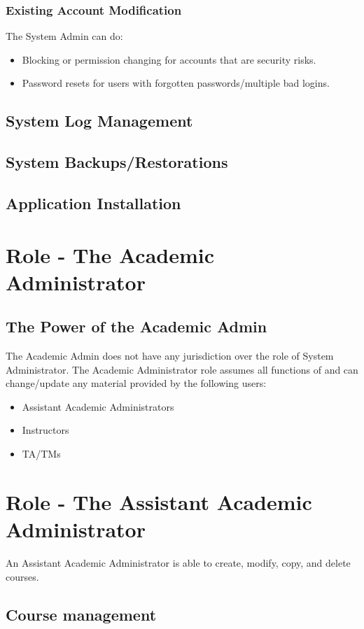 \documentclass{article}
\begin{document}
\subsubsection{Existing Account Modification}
The System Admin can do:
\begin{itemize}
  \item Blocking or permission changing for accounts that are security risks.
  \item Password resets for users with forgotten passwords/multiple bad logins.
\end{itemize}
\subsection{System Log Management}
\subsection{System Backups/Restorations}
\subsection{Application Installation}

\section{Role - The Academic Administrator}
\subsection{The Power of the Academic Admin}
The Academic Admin does not have any jurisdiction over the role of System Administrator.
The Academic Administrator role assumes all functions of and can change/update any material
provided by the following users:
\begin{itemize}
  \item Assistant Academic Administrators
  \item Instructors
  \item TA/TMs
\end{itemize}

\section{Role - The Assistant Academic Administrator}
An Assistant Academic Administrator is able to create, modify, copy, and delete courses.
\subsection {Course management}
\end{document}
